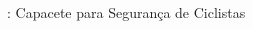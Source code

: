 \begin{frame}{\Wearable: Capacete para Segurança de Ciclistas}
\begin{columns}
\begin{column}{0.4\textwidth}
            \end{column}
        \end{columns}
    \end{frame}
